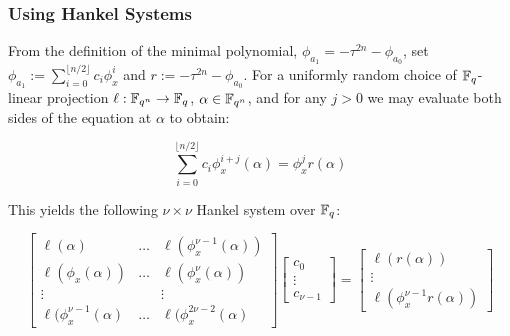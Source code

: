 \subsubsection{Using Hankel Systems}

From the definition of the minimal polynomial, $\phi_{a_1} = -\tau^{2n} - \phi_{a_0}$, set $\phi_{a_1} := \sum_{i=0}^{\lfloor n/2 \rfloor} c_i\phi_{x}^i$ and $r := -\tau^{2n} - \phi_{a_0}$. For a uniformly random choice of $\mathbb{F}_q$-linear projection $\ell : \mathbb{F}_{q^n} \to \mathbb{F}_q$, $\alpha \in \mathbb{F}_{q^n}$, and for any $j > 0$ we may evaluate both sides of the equation at $\alpha$ to obtain:



\begin{equation*}
    \sum_{i=0}^{\lfloor n/2 \rfloor} c_i\phi_{x}^{i +j}(\alpha) = \phi_x^jr(\alpha)
\end{equation*}

This yields the following $\nu \times \nu$ Hankel system over $\mathbb{F}_q$:

\begin{equation*}
    \begin{bmatrix}
    \ell(\alpha) & \ldots & \ell(\phi_x^{\nu - 1}(\alpha)) \\
    \ell(\phi_x(\alpha)) & \ldots & \ell(\phi_x^{\nu}(\alpha)) \\
    \vdots & & \vdots \\
    \ell(\phi_x^{\nu - 1}(\alpha) & \ldots & \ell(\phi_x^{2\nu - 2}(\alpha)
    \end{bmatrix}
    \begin{bmatrix}c_0 \\ \vdots \\ c_{\nu - 1} \end{bmatrix} = 
    \begin{bmatrix} \ell (r(\alpha)) \\ \vdots \\ \ell(\phi_x^{\nu - 1}r(\alpha)) \end{bmatrix}
\end{equation*}


